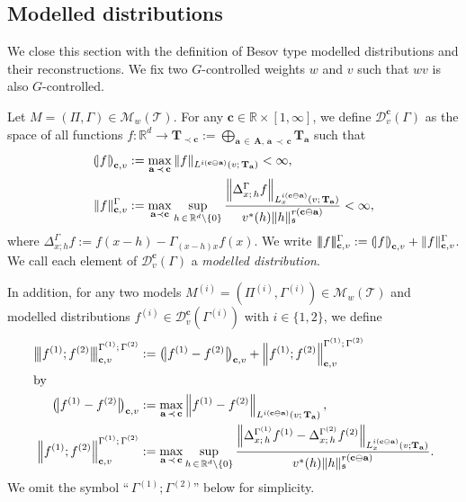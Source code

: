 \documentclass[AHL,Unicode,longabstracts,published]{cedram}
\newcommand{\bbR}{\mathbb{R}}
\newcommand{\mfs}{\mathfrak{s}}
\newcommand{\vco}{v^*}
\newcommand{\bfa}{\mathbf{a}}
\newcommand{\bfc}{\mathbf{c}}
\newcommand{\bfcoa}{\mathbf{c}\ominus\mathbf{a}}
\newcommand{\bfA}{\mathbf{A}}
\newcommand{\bfT}{\mathbf{T}}
\newcommand{\mcD}{\mathcal{D}}
\newcommand{\scT}{\mathscr{T}}
\newcommand{\scM}{\mathscr{M}}
\newcommand{\tri}{|\!|\!|}
\newcommand{\llparenthesis}{\mathopen{(\mkern -2.7mu|}}
\newcommand{\rrparenthesis}{\mathclose{|\mkern -2.7mu)}}
\newcommand{\llbigparenthesis}{\mathopen{\big(\mkern -2.7mu\big|}}
\newcommand{\rrbigparenthesis}{\mathclose{\big|\mkern -2.7mu\big)}}
\newcommand{\lbp}{\llbigparenthesis}
\newcommand{\rbp}{\rrbigparenthesis}
\newcommand{\lp}{\llparenthesis}
\newcommand{\rp}{\rrparenthesis}
\newcommand{\bigtri}{\big|\mkern -2.7mu\big|\mkern -2.7mu\big|}
\begin{document}
\subsection{Modelled distributions}

We close this section with the definition of Besov type modelled distributions and their reconstructions. We fix two $G$-controlled weights $w$ and $v$ such that $wv$ is also $G$-controlled.


\begin{defi}\label{def:besovMD}
Let $M=(\Pi,\Gamma)\in\scM_{w}(\scT)$. For any $\bfc\in\bbR\times[1,\infty]$, we define $\mcD_{v}^\bfc(\Gamma)$ as the space of all functions $f:\bbR^d\to \bfT_{\prec \bfc}:=\bigoplus_{\bfa\,\in\,\bfA,\, \bfa\,\prec \,\bfc}\bfT_\bfa$ such that
\begin{align*}
\lp f\rp_{\bfc,v}&:=\max_{\bfa\,\prec \,\bfc}\|f\|_{L^{i(\bfcoa)}(v;\,\bfT_\bfa)}<\infty,\\
\| f\|_{\bfc,v}^\Gamma&:=\max_{\bfa\prec\bfc}
\sup_{h\,\in\,\bbR^d\setminus\{0\}}
\frac{\left\|\Delta_{x;\,h}^\Gamma f\right\|_{L_x^{i(\bfcoa)}(v;\,\bfT_\bfa)}}{\vco(h)\|h\|_\mfs^{r(\bfcoa)}}<\infty,
\end{align*}
where $\Delta_{x;h}^\Gamma f:=f(x-h)-\Gamma_{(x-h)x}f(x)$. We write $\tri f\tri_{\bfc,v}^\Gamma:=\lp f\rp_{\bfc,v}+\|f\|_{\bfc,v}^\Gamma$. We call each element of $\mcD_v^{\bfc}(\Gamma)$ a \emph{modelled distribution}.

In addition, for any two models $M^{(i)}=(\Pi^{(i)},\Gamma^{(i)})\in\scM_{w}(\scT)$ and modelled distributions $f^{(i)}\in\mcD_{v}^\bfc(\Gamma^{(i)})$ with $i\in\{1,2\}$, we define
\begin{align*}
\bigtri f^{(1)};f^{(2)}\bigtri_{\bfc,v}^{\Gamma^{(1)};\,\Gamma^{(2)}} &:=\lbp f^{(1)}-f^{(2)}\rbp_{\bfc,v}+\left\|f^{(1)};f^{(2)}\right\|_{\bfc,v}^{\Gamma^{(1)};\,\Gamma^{(2)}}
\\
\intertext{by}
\lbp f^{(1)}-f^{(2)}\rbp_{\bfc,v}&:=\max_{\bfa\,\prec \,\bfc}\left\|f^{(1)}-f^{(2)}\right\|_{L^{i(\bfcoa)}\left(v;\,\bfT_\bfa\right)},\\
\left\| f^{(1)};f^{(2)}\right\|_{\bfc,v}^{\Gamma^{(1)};\,\Gamma^{(2)}}&:=\max_{\bfa\,\prec\, \bfc}
\sup_{h\,\in\,\bbR^d\setminus\{0\}}
\frac{\left\|\Delta_{x;\,h}^{\Gamma^{(1)}} f^{(1)}-\Delta_{x;\,h}^{\Gamma^{(2)}}f^{(2)}\right\|_{L_x^{i(\bfcoa)}\left(v;\bfT_\bfa\right)}}{\vco(h)\|h\|_\mfs^{r(\bfcoa)}}.
\end{align*}
We omit the symbol ``$\,\Gamma^{(1)};\Gamma^{(2)}$'' below for simplicity.
\end{defi}
\end{document}
